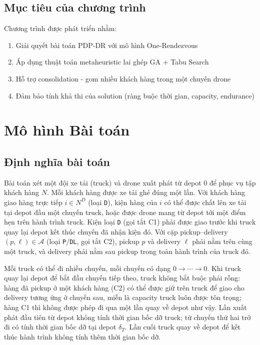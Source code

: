 \documentclass[12pt,a4paper]{article}
\begin{document}
\subsection{Mục tiêu của chương trình}

Chương trình được phát triển nhằm:
\begin{enumerate}
    \item Giải quyết bài toán PDP-DR với mô hình One-Rendezvous
    \item Áp dụng thuật toán metaheuristic lai ghép GA + Tabu Search
    \item Hỗ trợ consolidation - gom nhiều khách hàng trong một chuyến drone
    \item Đảm bảo tính khả thi của solution (ràng buộc thời gian, capacity, endurance)
\end{enumerate}

\section{Mô hình Bài toán}

\subsection{Định nghĩa bài toán}

Bài toán xét một đội xe tải (truck) và drone xuất phát từ depot $0$ để phục vụ tập
khách hàng $N$. Mỗi khách hàng được xe tải ghé đúng một lần. Với khách hàng giao hàng
trực tiếp $i \in N^D$ (loại \texttt{D}), kiện hàng của $i$ có thể được chất lên xe tải
tại depot đầu một chuyến truck, hoặc được drone mang từ depot tới một điểm hẹn trên
hành trình truck. Kiện loại \texttt{D} (gọi tắt C1) phải được giao trước khi truck
quay lại depot kết thúc chuyến đã nhận kiện đó. Với cặp pickup--delivery
$(p,\ell)\in\mathcal A$ (loại \texttt{P}/\texttt{DL}, gọi tắt C2), pickup $p$ và
delivery $\ell$ phải nằm trên cùng một truck, và delivery phải nằm sau pickup trong
toàn hành trình của truck đó.

Mỗi truck có thể đi nhiều chuyến, mỗi chuyến có dạng $0 \to \cdots \to 0$. Khi truck
quay lại depot để bắt đầu chuyến tiếp theo, truck không bắt buộc phải rỗng: hàng đã
pickup ở một khách hàng (C2) có thể được giữ trên truck để giao cho delivery tương ứng
ở chuyến sau, miễn là capacity truck luôn được tôn trọng; hàng C1 thì không được phép
đi qua một lần quay về depot như vậy. Lần xuất phát đầu tiên từ depot không tính thời
gian bốc dỡ truck; từ chuyến thứ hai trở đi có tính thời gian bốc dỡ tại depot
$\delta_T$. Lần cuối truck quay về depot để kết thúc hành trình không tính thêm thời
gian bốc dỡ.
\end{document}
